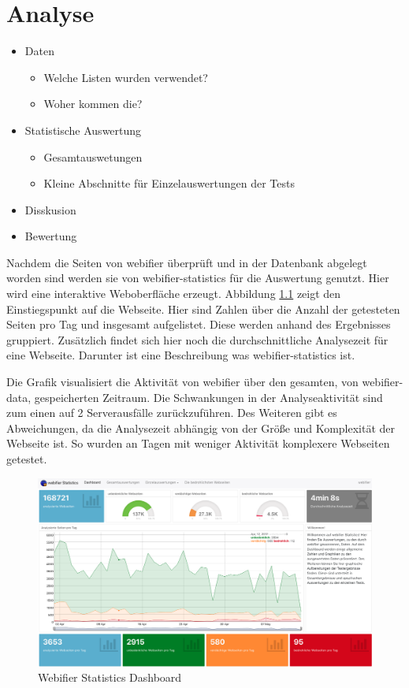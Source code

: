 \chapter{Analyse}

\begin{itemize}
  \item Daten
  \begin{itemize}
    \item Welche Listen wurden verwendet?
    \item Woher kommen die?
  \end{itemize}
  \item Statistische Auswertung
  \begin{itemize}
    \item Gesamtauswetungen
    \item Kleine Abschnitte für Einzelauswertungen der Tests
  \end{itemize}
  \item Disskusion
  \item Bewertung
\end{itemize}

Nachdem die Seiten von webifier überprüft und in der Datenbank abgelegt worden sind werden sie von webifier-statistics für die Auswertung genutzt. Hier wird eine interaktive Weboberfläche erzeugt. Abbildung \ref{fig:dashboard} zeigt den Einstiegspunkt auf die Webseite. Hier sind Zahlen über die Anzahl der getesteten Seiten pro Tag und insgesamt aufgelistet. Diese werden anhand des Ergebnisses gruppiert. Zusätzlich findet sich hier noch die durchschnittliche Analysezeit für eine Webseite. Darunter ist eine Beschreibung was webifier-statistics ist.

Die Grafik visualisiert die Aktivität von webifier über den gesamten, von webifier-data, gespeicherten Zeitraum. Die Schwankungen in der Analyseaktivität sind zum einen auf 2 Serverausfälle zurückzuführen. Des Weiteren gibt es Abweichungen, da die Analysezeit abhängig von der Größe und Komplexität der Webseite ist. So wurden an Tagen mit weniger Aktivität komplexere Webseiten getestet.
\begin{figure}[H]
  \centering
  \includegraphics[width=15cm]{images/stats/dashboard}
  \caption{Webifier Statistics Dashboard}
  \label{fig:dashboard}
\end{figure}

